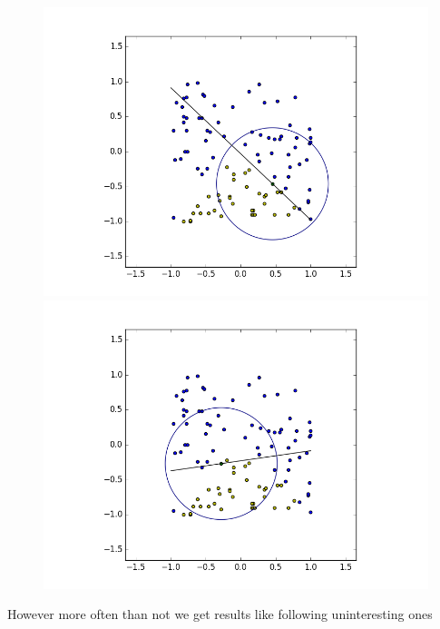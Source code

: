\documentclass{article}
\theoremstyle{definition}
\begin{document}
\begin{figure}[H]
  \centering
  \begin{minipage}[b]{0.4\textwidth}
    \includegraphics[width=\textwidth]{BoundaryHunter-Attempt3-R0.png}
    \caption{}
  \end{minipage}
  \hfill
  \begin{minipage}[b]{0.4\textwidth}
    \includegraphics[width=\textwidth]{BoundaryHunter-Attempt3-R1.png}
    \caption{}
  \end{minipage}
  \hfill
\end{figure}

However more often than not we get results like following uninteresting ones
\end{document}
